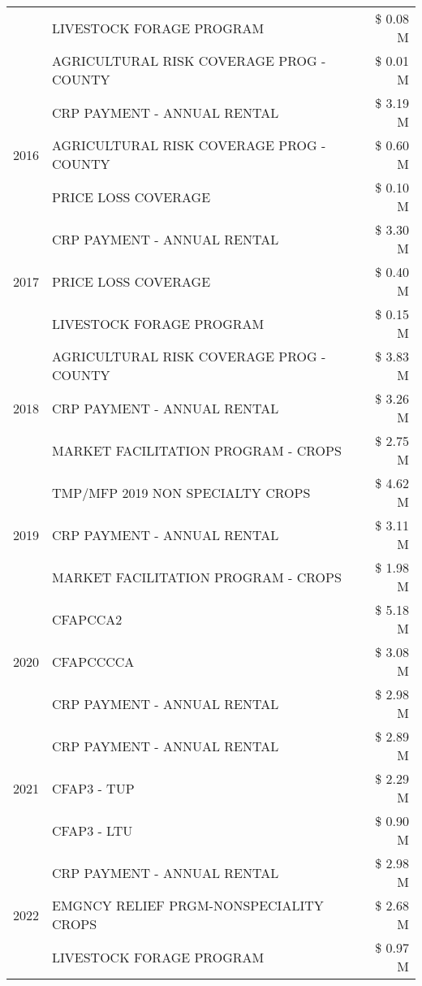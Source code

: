 \begin{tabular}{llr}
 & LIVESTOCK FORAGE PROGRAM & \$ 0.08 M \\
 & AGRICULTURAL RISK COVERAGE PROG - COUNTY & \$ 0.01 M \\
\cline{1-3}
\multirow[t]{3}{*}{2016} & CRP PAYMENT - ANNUAL RENTAL & \$ 3.19 M \\
 & AGRICULTURAL RISK COVERAGE PROG - COUNTY & \$ 0.60 M \\
 & PRICE LOSS COVERAGE & \$ 0.10 M \\
\cline{1-3}
\multirow[t]{3}{*}{2017} & CRP PAYMENT - ANNUAL RENTAL & \$ 3.30 M \\
 & PRICE LOSS COVERAGE & \$ 0.40 M \\
 & LIVESTOCK FORAGE PROGRAM & \$ 0.15 M \\
\cline{1-3}
\multirow[t]{3}{*}{2018} & AGRICULTURAL RISK COVERAGE PROG - COUNTY & \$ 3.83 M \\
 & CRP PAYMENT - ANNUAL RENTAL & \$ 3.26 M \\
 & MARKET FACILITATION PROGRAM - CROPS & \$ 2.75 M \\
\cline{1-3}
\multirow[t]{3}{*}{2019} & TMP/MFP 2019 NON SPECIALTY CROPS & \$ 4.62 M \\
 & CRP PAYMENT - ANNUAL RENTAL & \$ 3.11 M \\
 & MARKET FACILITATION PROGRAM - CROPS & \$ 1.98 M \\
\cline{1-3}
\multirow[t]{3}{*}{2020} & CFAPCCA2 & \$ 5.18 M \\
 & CFAPCCCCA & \$ 3.08 M \\
 & CRP PAYMENT - ANNUAL RENTAL & \$ 2.98 M \\
\cline{1-3}
\multirow[t]{3}{*}{2021} & CRP PAYMENT - ANNUAL RENTAL & \$ 2.89 M \\
 & CFAP3 - TUP & \$ 2.29 M \\
 & CFAP3 - LTU & \$ 0.90 M \\
\cline{1-3}
\multirow[t]{3}{*}{2022} & CRP PAYMENT - ANNUAL RENTAL & \$ 2.98 M \\
 & EMGNCY RELIEF PRGM-NONSPECIALITY CROPS & \$ 2.68 M \\
 & LIVESTOCK FORAGE PROGRAM & \$ 0.97 M \\
\cline{1-3}
\bottomrule
\end{tabular}
